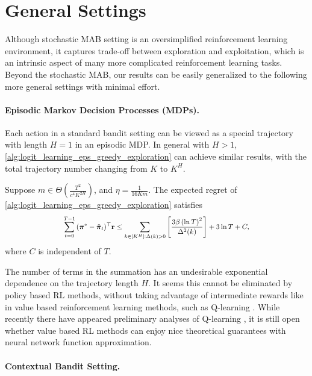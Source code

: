 \section{General Settings}
\label{sec:general_settings}

Although stochastic MAB setting is an oversimplified reinforcement learning environment, it captures trade-off between exploration and exploitation, which is an intrinsic aspect of many more complicated reinforcement learning tasks. Beyond the stochastic MAB, our results can be easily generalized to the following more general settings with minimal effort.

\paragraph{Episodic Markov Decision Processes (MDPs).}

Each action in a standard bandit setting can be viewed as a special trajectory with length $H = 1$ in an episodic MDP. In general with $H > 1$, \cref{alg:logit_learning_eps_greedy_exploration} can achieve similar results, with the total trajectory number changing from $K$ to $K^H$.
\begin{thm}
\label{thm:episodic_mdp_setting}
     Suppose $m \in \Theta\left( \frac{T^2}{c^4 K^{2H}} \right)$, and $\eta = \frac{ 1 }{16 K m}$. The expected regret of \cref{alg:logit_learning_eps_greedy_exploration} satisfies
\begin{equation*}
\scalemath{0.85}{
	\sum\limits_{t=0}^{T-1}{ ( {\rvpi^*} - \tilde{\rvpi}_t )^\top \rvr } \le \sum\limits_{k \in [K^H] : \Delta(k) > 0}{ \left[ \frac{ 3 \beta \left( \ln{T} \right)^2}{\Delta^2(k)} \right] } + 3 \ln{T} + C,
}
\end{equation*} 
where $C$ is independent of $T$.
\end{thm}

The number of terms in the summation has an undesirable exponential dependence on the trajectory length $H$. It seems this cannot be eliminated by policy based RL methods, without taking advantage of intermediate rewards like in value based reinforcement learning methods, such as Q-learning \citep{jin2018q}. While recently there have appeared preliminary analyses of Q-learning \citep{yang2019theoretical,achiam2019towards}, it is still open whether value based RL methods can enjoy nice theoretical guarantees with neural network function approximation.

\paragraph{Contextual Bandit Setting.}

